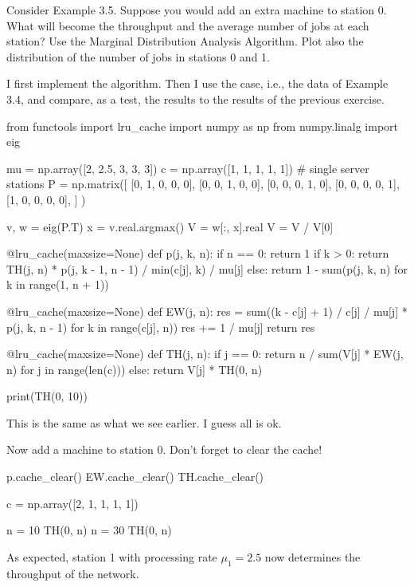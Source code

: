 \begin{exercise}
  Consider Example 3.5. Suppose you would add an extra machine to
  station 0. What will become the throughput and the average number of
  jobs at each station? Use the Marginal Distribution Analysis
  Algorithm. Plot also the distribution of the number of jobs in
  stations 0 and 1.
  \begin{solution}
    I first implement the algorithm. Then I use the case, i.e., the
    data of Example 3.4, and compare, as a test, the results to the
    results of the previous exercise.

\begin{pyconsole}
from functools import lru_cache
import numpy as np
from numpy.linalg import eig

mu = np.array([2, 2.5, 3, 3, 3])
c = np.array([1, 1, 1, 1, 1])  # single server stations
P = np.matrix([
    [0, 1, 0, 0, 0],
    [0, 0, 1, 0, 0],
    [0, 0, 0, 1, 0],
    [0, 0, 0, 0, 1],
    [1, 0, 0, 0, 0],
]
)

v, w = eig(P.T)
x = v.real.argmax()
V = w[:, x].real
V = V / V[0]


@lru_cache(maxsize=None)
def p(j, k, n):
    if n == 0:
        return 1
    if k > 0:
        return TH(j, n) * p(j, k - 1, n - 1) / min(c[j], k) / mu[j]
    else:
        return 1 - sum(p(j, k, n) for k in range(1, n + 1))


@lru_cache(maxsize=None)
def EW(j, n):
    res = sum((k - c[j] + 1) / c[j] / mu[j] * p(j, k, n - 1)
              for k in range(c[j], n))
    res += 1 / mu[j]
    return res


@lru_cache(maxsize=None)
def TH(j, n):
    if j == 0:
        return n / sum(V[j] * EW(j, n) for j in range(len(c)))
    else:
        return V[j] * TH(0, n)

print(TH(0, 10))
  
\end{pyconsole}

This is the same as what we see earlier. I guess all is ok. 

Now add a machine to station 0. Don't forget to clear the cache!

\begin{pyconsole}
p.cache_clear()
EW.cache_clear()
TH.cache_clear()

c = np.array([2, 1, 1, 1, 1])

n = 10
TH(0, n)
n = 30
TH(0, n)
  
\end{pyconsole}

As expected, station 1 with processing rate $\mu_1=2.5$ now determines
the throughput of the network.



\end{solution}
\end{exercise}
